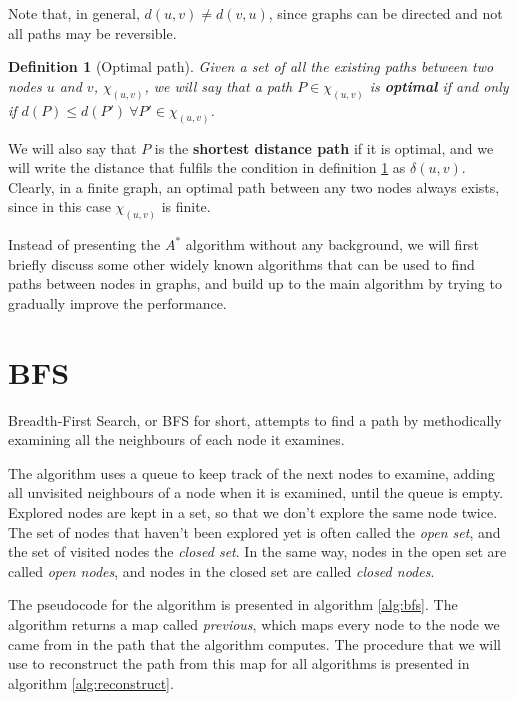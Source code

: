 \documentclass[12pt]{report}
\newtheorem{definition}[theorem]{Definition}
\begin{document}
Note that, in general, $d(u, v) \neq d(v, u)$, since graphs can be directed and not all paths may be reversible.

\begin{definition}[Optimal path]
\label{def:optimal}
Given a set of all the existing paths between two nodes $u$ and $v$, $\chi_{(u, v)}$, we will say that a path $P \in \chi_{(u,v)}$ is \textbf{optimal} if and only if $d(P) \le d(P') \ \forall P' \in \chi_{(u, v)}$.
\end{definition}

We will also say that $P$ is the \textbf{shortest distance path} if it is optimal, and we will write the distance that fulfils the condition in definition \ref{def:optimal} as $\delta(u,v)$. Clearly, in a finite graph, an optimal path between any two nodes always exists, since in this case $\chi_{(u, v)}$ is finite.

Instead of presenting the $A^*$ algorithm without any background, we will first briefly discuss some other widely known algorithms that can be used to find paths between nodes in graphs, and build up to the main algorithm by trying to gradually improve the performance.

\section{BFS}
Breadth-First Search, or BFS for short, attempts to find a path by methodically examining all the neighbours of each node it examines.

The algorithm uses a queue to keep track of the next nodes to examine, adding all unvisited neighbours of a node when it is examined, until the queue is empty. Explored nodes are kept in a set, so that we don't explore the same node twice. The set of nodes that haven't been explored yet is often called the \emph{open set}, and the set of visited nodes the \emph{closed set}. In the same way, nodes in the open set are called \emph{open nodes}, and nodes in the closed set are called \emph{closed nodes}.

The pseudocode for the algorithm is presented in algorithm \ref{alg:bfs}. The algorithm returns a map called \emph{previous}, which maps every node to the node we came from in the path that the algorithm computes. The procedure that we will use to reconstruct the path from this map for all algorithms is presented in algorithm \ref{alg:reconstruct}.
\end{document}
